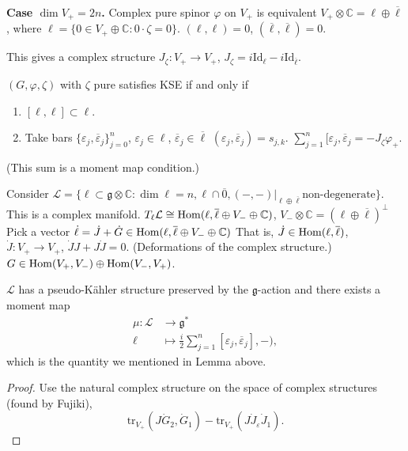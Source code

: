 \medskip\noindent
{\bf Case $\dim V_+=2n$.}
Complex pure spinor $\varphi$ on $V_+$ is
equivalent $V_+ \otimes \mathbb{C}=\ell
\oplus \overline{\ell}$,
where $\ell=\{0 \in V_+ \oplus \mathbb{C}:0
\cdot\zeta=0\}$.
$(\ell,\ell)=0$,
$(\overline{\ell},\overline{\ell})=0$.

This gives a complex structure
$J_\zeta:V_+ \to V_+$, $J_\zeta=i
\text{Id}_\ell-i
\text{Id}_{\overline{\ell}}$.

\begin{lemma}
\label{lemma-solutions-KSE}
$(G,\varphi,\zeta)$ with $\zeta$ pure
satisfies KSE if and only if
\begin{enumerate}
\item $[\ell,\ell]\subset \ell$.
\item Take bars
$\{\varepsilon_j,\overline{\varepsilon}_j\}
^n_{j=0}$,
$\varepsilon_j \in \ell$,
$\overline{\varepsilon}_j\in \overline{\ell}$
$(\varepsilon_j,\overline{\varepsilon}_j) =
s_{j,k}$.
$\sum_{j=1}^n[\varepsilon_j,
\overline{\varepsilon}_j=-J_\zeta
\varphi_+$.
\end{enumerate}
\end{lemma}
(This sum is a moment map condition.)

Consider $\mathcal{L}=\{\ell \subset
\mathfrak{g} \otimes \mathbb{C}:
\dim\ell=n,\ell\cap\overline{0},(-,-)|_{\ell
\oplus \overline{\ell}}
\text{non-degenerate}\}$.
This is a complex manifold.
$T_\ell \mathcal{L}
\cong \mathop{\mathrm{Hom}}\nolimits(\ell,\overline{\ell}\oplus V_-
\oplus \mathbb{C})$,
$V_- \otimes \mathbb{C}=(\ell \oplus
\overline{\ell})^\perp$
Pick a vector $\dot \ell = \dot J + \dot G
\in
\mathop{\mathrm{Hom}}\nolimits(\ell,\overline{\ell}\oplus V_- \oplus
\mathbb{C})$
That is, $\dot J \in \mathop{\mathrm{Hom}}\nolimits(\ell,
\overline{\ell})$,
$\dot J :V_+ \to V_+$,
$\dot J J+ J \dot J=0$. (Deformations of the
complex structure.)
$G \in \mathop{\mathrm{Hom}}\nolimits(V_+,V_-) \oplus \mathop{\mathrm{Hom}}\nolimits(V_-,V_+)$.

\begin{proposition}[Romero]
\label{proposition-Romero}
$\mathcal{L}$ has a pseudo-Kähler structure
preserved by the $\mathfrak{g}$-action and
there exists
a moment map
$$
\begin{aligned}
\mu: \mathcal{L} &\longrightarrow
\mathfrak{g}^* \\
\ell &\longmapsto
\frac{i}{2}\sum_{j=1}^n[\varepsilon_j,
\overline{\varepsilon}_j],-),
\end{aligned}
$$
which is the quantity we mentioned in Lemma
above.
\end{proposition}

\begin{proof}
Use the natural complex structure on the
space of complex structures
(found by Fujiki),
$$
\text{tr}_{V_+}(J \dot G_2,\dot
G_1)-\text{tr}_{V_+}(J \dot J_{\varepsilon}
\dot J_1).
$$
\end{proof}


